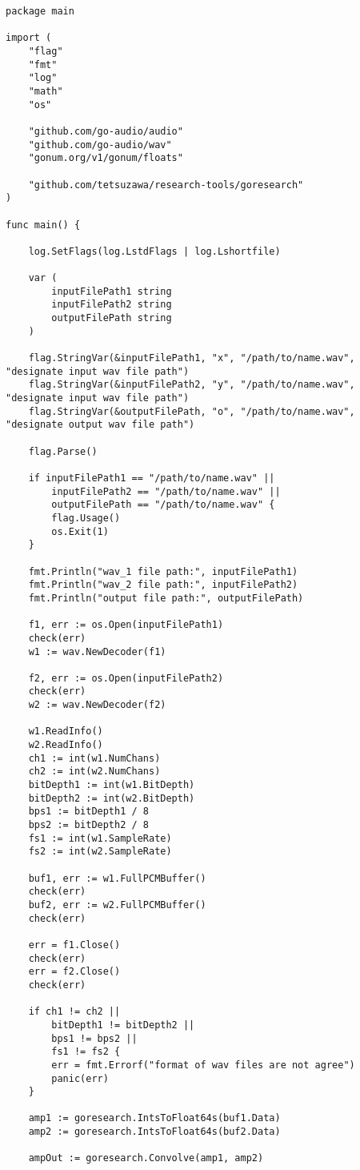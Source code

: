 \begin{lstlisting}[caption=cmd/convolve_wav/main.go,label=convolve_wav]
package main

import (
	"flag"
	"fmt"
	"log"
	"math"
	"os"

	"github.com/go-audio/audio"
	"github.com/go-audio/wav"
	"gonum.org/v1/gonum/floats"

	"github.com/tetsuzawa/research-tools/goresearch"
)

func main() {

	log.SetFlags(log.LstdFlags | log.Lshortfile)

	var (
		inputFilePath1 string
		inputFilePath2 string
		outputFilePath string
	)

	flag.StringVar(&inputFilePath1, "x", "/path/to/name.wav", "designate input wav file path")
	flag.StringVar(&inputFilePath2, "y", "/path/to/name.wav", "designate input wav file path")
	flag.StringVar(&outputFilePath, "o", "/path/to/name.wav", "designate output wav file path")

	flag.Parse()

	if inputFilePath1 == "/path/to/name.wav" ||
		inputFilePath2 == "/path/to/name.wav" ||
		outputFilePath == "/path/to/name.wav" {
		flag.Usage()
		os.Exit(1)
	}

	fmt.Println("wav_1 file path:", inputFilePath1)
	fmt.Println("wav_2 file path:", inputFilePath2)
	fmt.Println("output file path:", outputFilePath)

	f1, err := os.Open(inputFilePath1)
	check(err)
	w1 := wav.NewDecoder(f1)

	f2, err := os.Open(inputFilePath2)
	check(err)
	w2 := wav.NewDecoder(f2)

	w1.ReadInfo()
	w2.ReadInfo()
	ch1 := int(w1.NumChans)
	ch2 := int(w2.NumChans)
	bitDepth1 := int(w1.BitDepth)
	bitDepth2 := int(w2.BitDepth)
	bps1 := bitDepth1 / 8
	bps2 := bitDepth2 / 8
	fs1 := int(w1.SampleRate)
	fs2 := int(w2.SampleRate)

	buf1, err := w1.FullPCMBuffer()
	check(err)
	buf2, err := w2.FullPCMBuffer()
	check(err)

	err = f1.Close()
	check(err)
	err = f2.Close()
	check(err)

	if ch1 != ch2 ||
		bitDepth1 != bitDepth2 ||
		bps1 != bps2 ||
		fs1 != fs2 {
		err = fmt.Errorf("format of wav files are not agree")
		panic(err)
	}

	amp1 := goresearch.IntsToFloat64s(buf1.Data)
	amp2 := goresearch.IntsToFloat64s(buf2.Data)

	ampOut := goresearch.Convolve(amp1, amp2)


\end{lstlisting}
